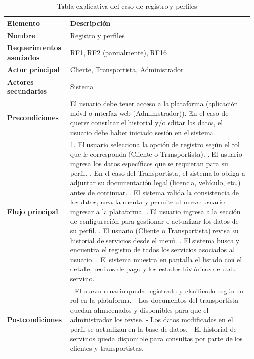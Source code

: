 \begin{table}
	\centering 
	\caption{Tabla explicativa del caso de registro y perfiles}
	\label{table: Tabla caso registro y perfiles}
	\renewcommand{\arraystretch}{1.4}
	\begin{tabular}{|p{4cm}|p{11cm}|}
		\hline
		\centering\textbf{Elemento} & \centering\textbf{Descripción}\tabularnewline
		\hline
		\textbf{Nombre} & Registro y perfiles \\
		\hline 
		\textbf{Requerimientos asociados} & RF1, RF2 (parcialmente), RF16 \\
		\hline
		\textbf{Actor principal} & Cliente, Transportista, Administrador \\
		\hline
		\textbf{Actores secundarios} & Sistema \\
		\hline
		\textbf{Precondiciones} & El usuario debe tener acceso a la plataforma (aplicación móvil o interfaz web (Administrador)). En el caso de querer consultar el historial y/o editar los datos, el usuario debe haber iniciado sesión en el sistema. \\
		\hline
		\textbf{Flujo principal} & 
		1. El usuario selecciona la opción de registro según el rol que le corresponda (Cliente o Transportista). \newline 
		2. El usuario ingresa los datos específicos que se requieran para su perfil. \newline 
		3. En el caso del Transportista, el sistema lo obliga a adjuntar su documentación legal (licencia, vehículo, etc.) antes de continuar. \newline 
		4. El sistema valida la consistencia de los datos, crea la cuenta y permite al nuevo usuario ingresar a la plataforma. \newline 
		5. El usuario ingresa a la sección de configuración para gestionar o actualizar los datos de su perfil. \newline 
		6. El usuario (Cliente o Transportista) revisa su historial de servicios desde el menú. \newline 
		7. El sistema busca y encuentra el registro de todos los servicios asociados al usuario. \newline 
		8. El sistema muestra en pantalla el listado con el detalle, recibos de pago y los estados históricos de cada servicio. \\
		\hline
		\textbf{Postcondiciones} & 
		- El nuevo usuario queda registrado y clasificado según su rol en la plataforma. \newline 
		- Los documentos del transportista quedan almacenados y disponibles para que el administrador los revise. \newline 
		- Los datos modificados en el perfil se actualizan en la base de datos. \newline 
		- El historial de servicios queda disponible para consultas por parte de los clientes y transportistas. \\
		\hline
	\end{tabular} 
\end{table}

